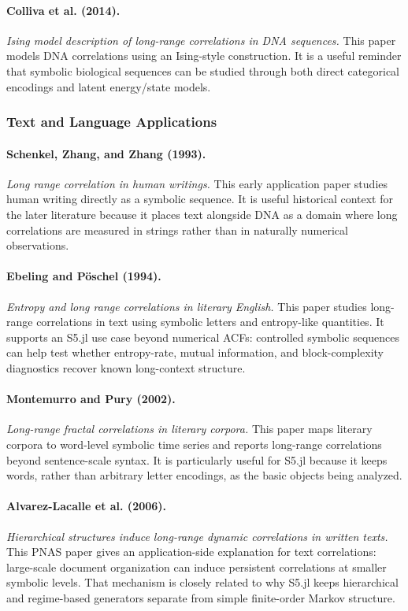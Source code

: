 \documentclass[11pt]{article}
\begin{document}
\paragraph{Colliva et al. (2014).}
\emph{Ising model description of long-range correlations in DNA sequences.}
This paper models DNA correlations using an Ising-style construction. It is a
useful reminder that symbolic biological sequences can be studied through both
direct categorical encodings and latent energy/state models.

\subsubsection{Text and Language Applications}

\paragraph{Schenkel, Zhang, and Zhang (1993).}
\emph{Long range correlation in human writings.}
This early application paper studies human writing directly as a symbolic
sequence. It is useful historical context for the later literature because it
places text alongside DNA as a domain where long correlations are measured in
strings rather than in naturally numerical observations.

\paragraph{Ebeling and Pöschel (1994).}
\emph{Entropy and long range correlations in literary English.}
This paper studies long-range correlations in text using symbolic letters and
entropy-like quantities. It supports an S5.jl use case beyond numerical ACFs:
controlled symbolic sequences can help test whether entropy-rate, mutual
information, and block-complexity diagnostics recover known long-context
structure.

\paragraph{Montemurro and Pury (2002).}
\emph{Long-range fractal correlations in literary corpora.}
This paper maps literary corpora to word-level symbolic time series and reports
long-range correlations beyond sentence-scale syntax. It is particularly useful
for S5.jl because it keeps words, rather than arbitrary letter encodings, as the
basic objects being analyzed.

\paragraph{Alvarez-Lacalle et al. (2006).}
\emph{Hierarchical structures induce long-range dynamic correlations in written
texts.}
This PNAS paper gives an application-side explanation for text correlations:
large-scale document organization can induce persistent correlations at smaller
symbolic levels. That mechanism is closely related to why S5.jl keeps
hierarchical and regime-based generators separate from simple finite-order
Markov structure.
\end{document}
